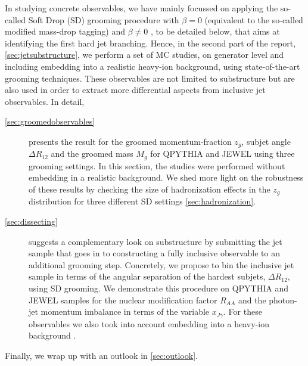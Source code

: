 In studying concrete observables, we have mainly focussed on applying the so-called Soft Drop (SD) grooming procedure with $\beta = 0$ (equivalent to the so-called modified mass-drop tagging) \cite{Dasgupta:2013ihk} and $\beta \neq 0$ \cite{Larkoski:2014wba}, to be detailed below, that aims at identifying the first hard jet branching. 
Hence, in the second part of the report, \autoref{sec:jetsubstructure}, we perform a set of MC studies, on generator level and including embedding into a realistic heavy-ion background, using state-of-the-art grooming techniques. These observables are  not limited to substructure but are also used in order to extract more differential aspects from inclusive jet observables. In detail, 
\begin{description}
\item[\autoref{sec:groomedobservables}] presents the result for the groomed momentum-fraction $z_g$, subjet angle $\Delta R_{12}$ and the groomed mass  $M_g$ for QPYTHIA and JEWEL using three grooming settings. In this section, the studies were performed without embedding in a realistic background. We shed more light on the robustness of these results by checking the size of hadronization effects in the $z_g$ distribution for three different SD settings \autoref{sec:hadronization}. 
\item[\autoref{sec:dissecting}] suggests a complementary look on substructure by submitting the jet sample that goes in to constructing a fully inclusive observable to an additional grooming step. Concretely, we propose to bin the inclusive jet sample in terms of the angular separation of the hardest subjets, $\Delta R_{12}$, using SD grooming. We demonstrate this procedure on QPYTHIA and JEWEL samples for the nuclear modification factor $R_{AA}$ and the photon-jet momentum imbalance in terms of the variable $x_{J\gamma}$. For these observables we also took into account embedding into a heavy-ion background \cite{deBarros:2012ws}.
\end{description}
Finally, we wrap up with an outlook in \autoref{sec:outlook}.



